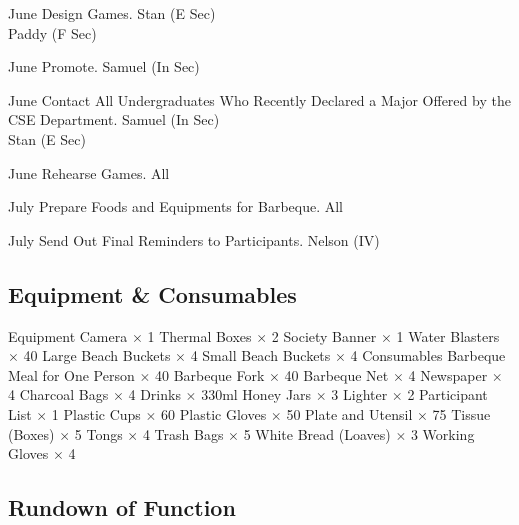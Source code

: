 \bTR{}
\eTD{} June
\eTD\bTD Design Games.
\eTD\bTD Stan (E Sec) \\ Paddy (F Sec)
\eTD\eTR

\bTR{}
\eTD{} June
\eTD\bTD Promote.
\eTD\bTD Samuel (In Sec)
\eTD\eTR

\bTR{}
\eTD{} June
\eTD\bTD Contact All Undergraduates Who Recently Declared a Major Offered by the CSE Department.
\eTD\bTD Samuel (In Sec) \\ Stan (E Sec)
\eTD\eTR

\bTR{}
\eTD{} June
\eTD\bTD Rehearse Games.
\eTD\bTD All
\eTD\eTR

\bTR{}
\eTD{} July
\eTD\bTD Prepare Foods and Equipments for Barbeque.
\eTD\bTD All
\eTD\eTR

\bTR{}
\eTD{} July
\eTD\bTD Send Out Final Reminders to Participants.
\eTD\bTD Nelson (IV)
\eTD\eTR

\eTABLEbody
\eTABLE

\subsection{Equipment \& Consumables}
\starttabulate[|l|l|]
\NC{}Equipment\NC\NR
\HL
\NC Camera                  \NC $\times$ 1  \NR
\NC Thermal Boxes           \NC $\times$ 2  \NR
\NC Society Banner          \NC $\times$ 1  \NR
\NC Water Blasters          \NC $\times$ 40 \NR
\NC Large Beach Buckets     \NC $\times$ 4  \NR
\NC Small Beach Buckets     \NC $\times$ 4  \NR
\HL
\NR
\NC{}Consumables\NC\NR
\HL
\NC Barbeque Meal for One Person \NC $\times$ 40  \NR
\NC Barbeque Fork \NC $\times$ 40  \NR
\NC Barbeque Net \NC $\times$ 4  \NR
\NC Newspaper \NC $\times$ 4  \NR
\NC Charcoal Bags \NC $\times$ 4  \NR
\NC Drinks  $\times$ 330ml  \NR
\NC Honey Jars \NC $\times$ 3  \NR
\NC Lighter \NC $\times$ 2  \NR
\NC Participant List \NC $\times$ 1  \NR
\NC Plastic Cups \NC $\times$ 60  \NR
\NC Plastic Gloves \NC $\times$ 50  \NR
\NC Plate and Utensil \NC $\times$ 75  \NR
\NC Tissue (Boxes) \NC $\times$ 5  \NR
\NC Tongs \NC $\times$ 4  \NR
\NC Trash Bags \NC $\times$ 5  \NR
\NC White Bread (Loaves) \NC $\times$ 3  \NR
\NC Working Gloves \NC $\times$ 4  \NR
\HL
\stoptabulate

\subsection{Rundown of Function}

